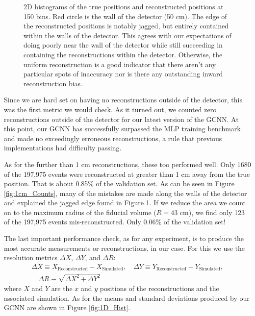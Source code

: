 \begin{figure}[t]
\begin{subfigure}[b]{0.45\textwidth}
	\end{subfigure}
	\caption{
	2D histograms of the true positions and reconstructed positions at 150 bins.
	Red circle is the wall of the detector (50 cm).
	The edge of the reconstructed positions is notably jagged, but entirely contained within the walls of the detector.
	This agrees with our expectations of doing poorly near the wall of the detector while still succeeding in containing the reconstructions within the detector.
	Otherwise, the uniform reconstruction is a good indicator that there aren't any particular spots of inaccuracy nor is there any outstanding inward reconstruction bias.
	}
	\label{fig:2D_Hists}
\end{figure}
\par Since we are hard set on having no reconstructions outside of the detector, this was the first metric we would check.
As it turned out, we counted zero reconstructions outside of the detector for our latest version of the GCNN.
At this point, our GCNN has successfully surpassed the MLP training benchmark and made no exceedingly erroneous reconstructions, a rule that previous implementations had difficulty passing.
\par As for the further than 1 cm reconstructions, these too performed well.
Only 1680 of the 197,975 events were reconstructed at greater than 1 cm away from the true position.
That is about 0.85\% of the validation set.
As can be seen in Figure \ref{fig:1cm_Counts}, many of the mistakes are made along the walls of the detector and explained the jagged edge found in Figure \ref{fig:2D_Hists}.
If we reduce the area we count on to the maximum radius of the fiducial volume ($R=43$ cm), we find only 123 of the 197,975 events mis-reconstructed.
Only 0.06\% of the validation set!
\par The last important performance check, as for any experiment, is to produce the most accurate measurements or reconstructions, in our case.
For this we use the resolution metrics $\Delta X$, $\Delta Y$, and $\Delta R$:
\begin{gather*}
	\Delta X \equiv X_\text{Reconstructed} - X_\text{Simulated},
	\quad \Delta Y \equiv Y_\text{Reconstructed} - Y_\text{Simulated}, \\
	\quad \Delta R \equiv \sqrt{ \Delta X^2 + \Delta Y^2 }
\end{gather*}
where $X$ and $Y$ are the $x$ and $y$ positions of the reconstructions and the associated simulation.
As for the means and standard deviations produced by our GCNN are shown in Figure \ref{fig:1D_Hist}.

